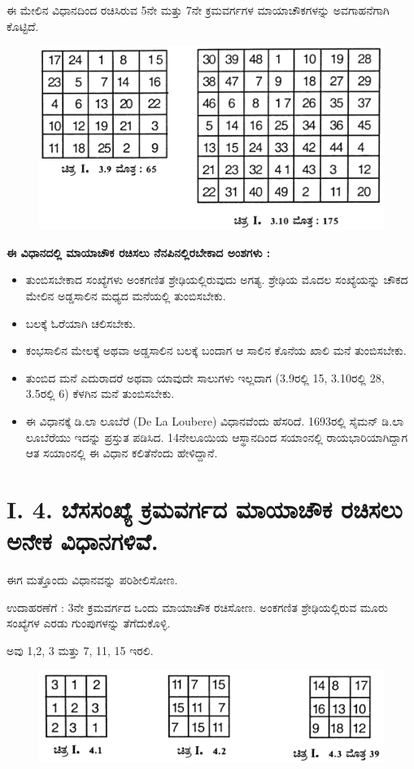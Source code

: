 \begin{itemize}
	ಈ ಮೇಲಿನ ವಿಧಾನದಿಂದ ರಚಿಸಿರುವ 5ನೇ ಮತ್ತು 7ನೇ ಕ್ರಮವರ್ಗಗಳ ಮಾಯಾಚೌಕಗಳನ್ನು ಅವಗಾಹನೆಗಾಗಿ ಕೊಟ್ಟಿದೆ.
	\begin{figure}[h]
	\includegraphics{src/figures/chap3/fig3.8.jpg}
	\end{figure}
\end{itemize}

\noindent \textbf{ಈ ವಿಧಾನದಲ್ಲಿ ಮಾಯಾಚೌಕ ರಚಿಸಲು ನೆನಪಿನಲ್ಲಿರಬೇಕಾದ ಅಂಶಗಳು :}
\begin{itemize}
\itemsep=7pt
	\item ತುಂಬಿಸಬೇಕಾದ ಸಂಖ್ಯೆಗಳು ಅಂಕಗಣಿತ ಶ್ರೇಢಿಯಲ್ಲಿರುವುದು ಅಗತ್ಯ. ಶ್ರೇಢಿಯ ಮೊದಲ ಸಂಖ್ಯೆಯನ್ನು ಚೌಕದ ಮೇಲಿನ ಅಡ್ಡಸಾಲಿನ ಮಧ್ಯದ ಮನೆಯಲ್ಲಿ ತುಂಬಿಸ\-ಬೇಕು.
	\item ಬಲಕ್ಕೆ ಓರೆಯಾಗಿ ಚಲಿಸಬೇಕು.
	\item ಕಂಭಸಾಲಿನ ಮೇಲಕ್ಕೆ ಅಥವಾ ಅಡ್ಡಸಾಲಿನ ಬಲಕ್ಕೆ ಬಂದಾಗ ಆ ಸಾಲಿನ ಕೊನೆಯ ಖಾಲಿ ಮನೆ ತುಂಬಿಸಬೇಕು.
	\item ತುಂಬಿದ ಮನೆ ಎದುರಾದರೆ ಅಥವಾ ಯಾವುದೇ ಸಾಲುಗಳು ಇಲ್ಲದಾಗ (3.9ರಲ್ಲಿ 15, 3.10ರಲ್ಲಿ 28, 3.5ರಲ್ಲಿ 6) ಕೆಳಗಿನ ಮನೆ ತುಂಬಿಸಬೇಕು.
	\item ಈ ವಿಧಾನಕ್ಕೆ ಡಿ.ಲಾ ಲೂಬೆರೆ (De La Loubere) ವಿಧಾನವೆಂದು ಹೆಸರಿದೆ. 1693ರಲ್ಲಿ ಸೈಮನ್ ಡಿ.ಲಾ ಲೂಬೆರೆಯು ಇದನ್ನು ಪ್ರಸ್ತುತ ಪಡಿಸಿದ. 14ನೇ\break ಲೂಯಿಯ ಆಸ್ಥಾನದಿಂದ ಸಯಾಂನಲ್ಲಿ ರಾಯಭಾರಿಯಾಗಿದ್ದಾಗ ಆತ ಸಯಾಂನಲ್ಲಿ ಈ ವಿಧಾನ ಕಲಿತೆನೆಂದು ಹೇಳಿದ್ದಾನೆ.
\end{itemize}

\section*{I. 4. ಬೆಸಸಂಖ್ಯೆ ಕ್ರಮವರ್ಗದ ಮಾಯಾಚೌಕ ರಚಿಸಲು ಅನೇಕ ವಿಧಾನಗಳಿವೆ.}

ಈಗ ಮತ್ತೊಂದು ವಿಧಾನವನ್ನು ಪರಿಶೀಲಿಸೋಣ.

ಉದಾಹರಣೆಗೆ : 3ನೇ ಕ್ರಮವರ್ಗದ ಒಂದು ಮಾಯಾಚೌಕ ರಚಿಸೋಣ. ಅಂಕಗಣಿತ ಶ್ರೇಢಿಯಲ್ಲಿರುವ ಮೂರು ಸಂಖ್ಯೆಗಳ ಎರಡು ಗುಂಪುಗಳನ್ನು ತೆಗೆದುಕೊಳ್ಳಿ.

ಅವು 1,2, 3 ಮತ್ತು 7, 11, 15 ಇರಲಿ.
\begin{figure}[h]
\includegraphics[scale=.9]{src/figures/chap3/fig3.9.jpg}
\end{figure}

